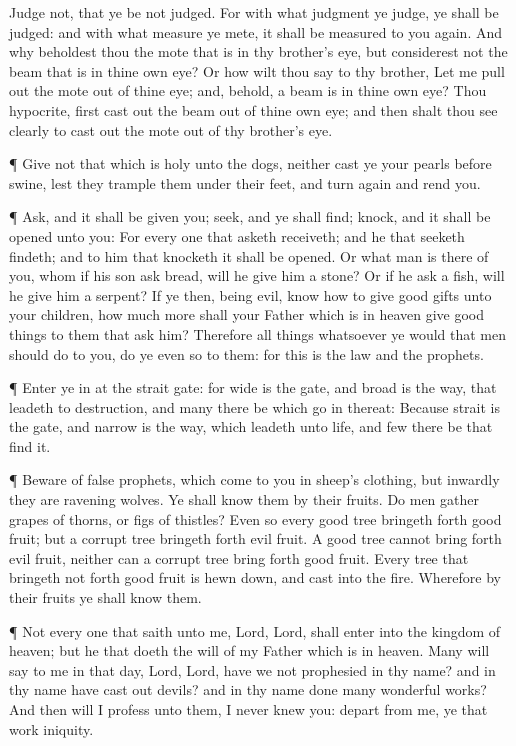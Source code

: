  Judge not, that ye be not judged.  For with
what judgment ye judge, ye shall be judged: and with what measure ye
mete, it shall be measured to you again.  And why beholdest
thou the mote that is in thy brother's eye, but considerest not the beam
that is in thine own eye?  Or how wilt thou say to thy
brother, Let me pull out the mote out of thine eye; and, behold, a beam
is in thine own eye?  Thou hypocrite, first cast out the
beam out of thine own eye; and then shalt thou see clearly to cast out
the mote out of thy brother's eye.

 ¶ Give not that which is holy unto the dogs, neither cast
ye your pearls before swine, lest they trample them under their feet,
and turn again and rend you.

 ¶ Ask, and it shall be given you; seek, and ye shall find;
knock, and it shall be opened unto you:  For every one that
asketh receiveth; and he that seeketh findeth; and to him that knocketh
it shall be opened.  Or what man is there of you, whom if
his son ask bread, will he give him a stone?  Or if he ask
a fish, will he give him a serpent?  If ye then, being
evil, know how to give good gifts unto your children, how much more
shall your Father which is in heaven give good things to them that ask
him?  Therefore all things whatsoever ye would that men
should do to you, do ye even so to them: for this is the law and the
prophets.

 ¶ Enter ye in at the strait gate: for wide is the gate,
and broad is the way, that leadeth to destruction, and many there be
which go in thereat:  Because strait is the gate, and
narrow is the way, which leadeth unto life, and few there be that find
it.

 ¶ Beware of false prophets, which come to you in sheep's
clothing, but inwardly they are ravening wolves.  Ye shall
know them by their fruits. Do men gather grapes of thorns, or figs of
thistles?  Even so every good tree bringeth forth good
fruit; but a corrupt tree bringeth forth evil fruit.  A
good tree cannot bring forth evil fruit, neither can a corrupt tree
bring forth good fruit.  Every tree that bringeth not forth
good fruit is hewn down, and cast into the fire.  Wherefore
by their fruits ye shall know them.

 ¶ Not every one that saith unto me, Lord, Lord, shall
enter into the kingdom of heaven; but he that doeth the will of my
Father which is in heaven.  Many will say to me in that
day, Lord, Lord, have we not prophesied in thy name? and in thy name
have cast out devils? and in thy name done many wonderful works?
 And then will I profess unto them, I never knew you:
depart from me, ye that work iniquity.

